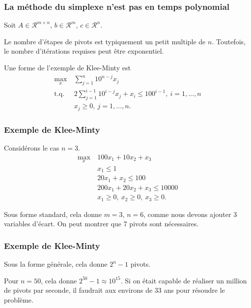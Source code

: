 \documentclass[t,usepdftitle=false]{beamer}
\def\cR{\mathcal{R}}
\begin{document}
\begin{frame}
\frametitle{La méthode du simplexe n'est pas en temps polynomial}

Soit $A \in \cR^{m \times n}$, $b \in \cR^m$, $c \in \cR^n$.

\mbox{}

Le nombre d'étapes de pivots est typiquement un petit multiple de $n$. Toutefois, le nombre d'itérations requises peut être exponentiel.

\mbox{}

Une forme de l'exemple de Klee-Minty est
\begin{align*}
\max_x \ & \sum_{j =1}^n 10^{n-j} x_j \\
\mbox{t.q. } & 2\sum_{j = 1}^{i-1} 10^{i-j} x_j + x_i \leq 100^{i-1},\ i = 1,\ldots, n\\
& x_j \geq 0,\ j = 1,\ldots, n.
\end{align*}

\end{frame}

\begin{frame}
\frametitle{Exemple de Klee-Minty}

Considérons le cas $n = 3$.
\begin{align*}
\max_x \ & 100x_1 + 10x_2 + x_3\\
& x_1 \leq 1 \\
& 20 x_1 + x_2 \leq 100 \\
& 200 x_1 + 20 x_2 + x_3 \leq 10000 \\
& x_1 \geq 0,\ x_2 \geq 0,\ x_3 \geq 0.
\end{align*}

\mbox{}

Sous forme standard, cela donne $m = 3$, $n = 6$, comme nous devons ajouter 3 variables d'écart. On peut montrer que 7 pivots sont nécessaires.

\end{frame}

\begin{frame}
\frametitle{Exemple de Klee-Minty}

Sous la forme générale, cela donne $2^n - 1$ pivots.

\mbox{}

Pour $n = 50$, cela donne $2^{50} - 1 \approx 10^{15}$. Si on était capable de réaliser un million de pivots par seconde, il faudrait aux environs de 33 ans pour résoudre le problème.

\end{frame}
\end{document}

